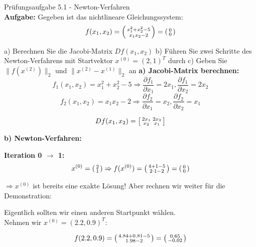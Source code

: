 \begin{example2}{Prüfungsaufgabe 5.1 - Newton-Verfahren}\\
\textbf{Aufgabe:} Gegeben ist das nichtlineare Gleichungssystem:
$$f(x_1, x_2) = \begin{psmallmatrix} x_1^2 + x_2^2 - 5 \\ x_1 x_2 - 2 \end{psmallmatrix} = \begin{psmallmatrix} 0 \\ 0 \end{psmallmatrix}$$

a) Berechnen Sie die Jacobi-Matrix $Df(x_1, x_2)$
b) Führen Sie zwei Schritte des Newton-Verfahrens mit Startvektor $x^{(0)} = (2, 1)^T$ durch
c) Geben Sie $\|f(x^{(2)})\|_2$ und $\|x^{(2)} - x^{(1)}\|_2$ an
\tcblower
\textbf{a) Jacobi-Matrix berechnen:}
$$f_1(x_1, x_2) = x_1^2 + x_2^2 - 5 \Rightarrow \frac{\partial f_1}{\partial x_1} = 2x_1, \frac{\partial f_1}{\partial x_2} = 2x_2$$
$$f_2(x_1, x_2) = x_1 x_2 - 2 \Rightarrow \frac{\partial f_2}{\partial x_1} = x_2, \frac{\partial f_2}{\partial x_2} = x_1$$

$$Df(x_1, x_2) = \begin{bsmallmatrix} 2x_1 & 2x_2 \\ x_2 & x_1 \end{bsmallmatrix}$$

\textbf{b) Newton-Verfahren:}

\textbf{Iteration 0 $\rightarrow$ 1:}
$$x^{(0)} = \begin{psmallmatrix} 2 \\ 1 \end{psmallmatrix} \Rightarrow
f(x^{(0)}) = \begin{psmallmatrix} 4 + 1 - 5 \\ 2 \cdot 1 - 2 \end{psmallmatrix} = \begin{psmallmatrix} 0 \\ 0 \end{psmallmatrix}$$

$\Rightarrow x^{(0)}$ ist bereits eine exakte Lösung! Aber rechnen wir weiter für die Demonstration:

Eigentlich sollten wir einen anderen Startpunkt wählen. \\ Nehmen wir $x^{(0)} = (2.2, 0.9)^T$:

$$f(2.2, 0.9) = \begin{psmallmatrix} 4.84 + 0.81 - 5 \\ 1.98 - 2 \end{psmallmatrix} = \begin{psmallmatrix} 0.65 \\ -0.02 \end{psmallmatrix}$$


\end{example2}
